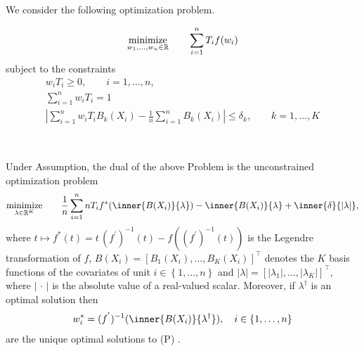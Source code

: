 We consider the following optimization problem.
\begin{problem}
  \begin{gather*}
    \underset{w_1, \ldots, w_n \in \mathbb{R}}{\mathrm{minimize}}
    \qquad
    \sum_{i = 1}^{n} T_i f(w_i)
  \end{gather*}
subject to the constraints
\begin{gather*}
    w_i T_i \ge 0,
    \qquad 
    i = 1, \ldots, n,
    \\
  \sum_{ i = 1 }^{n}
    w_i T_i
  =
  1
  \\
    \left| 
      \sum_{i = 1}^{n} w_i T_i B_k(X_i)
      - 
      \frac{1}{n} \sum_{i = 1}^{n} B_k(X_i)
    \right|
    \le 
    \delta_k,
    \qquad
    k = 1, \ldots, K
\end{gather*}
\end{problem}
\pagebreak
~\begin{ftheorem}
  Under Assumption,
  the dual of the above Problem is the unconstrained optimization problem 
  \begin{gather*}
    \underset{\lambda \in \R^K}{\mathrm{minimize}}
    \qquad
    \frac{1}{n}
    \sum_{i = 1}^{n} 
    nT_i 
    f^*
    (
      \inner{B(X_i)}{\lambda}
    )
    -
    \inner{B(X_i)}{\lambda}
    +
    \inner{\delta}{\left| \lambda \right|}
    ,
  \end{gather*}
  where
  $
  t \mapsto
    f^*(t)
    =
    t\,(f^{'})^{-1}(t)
    -
    f
    \left( 
      (f^{'})^{-1}(t)
    \right)
  $
  is the Legendre transformation of $f$,
  $
    B(X_i)
    =
    \left[ 
      B_1(X_i)
      ,
      \ldots
      ,
      B_K(X_i)
    \right]
    ^\top
  $
  denotes the $K$ basis functions of the covariates 
  of unit $i\in \left\{ 1, \ldots, n \right\}$
  and
  $
    \left| \lambda \right|
    =
    \left[ 
      \left| \lambda_1 \right|
      ,
      \ldots
      ,
      \left| \lambda_K \right|
    \right]
    ^\top
    ,
  $
  where $\left| \,\cdot\, \right|$
  is the absolute value of a real-valued scalar.
  Moreover, if $\lambda^\dagger$
  is an optimal solution then
  \begin{gather}
    w_i^*
    =
    (f^{'})^{-1}
    (
      \inner{B(X_i)}{\lambda^\dagger}
    )
    ,
    \quad
    i\in \left\{ 1,\ldots, n \right\}
  \end{gather}
  are the unique optimal solutions to (P)
  .
\end{ftheorem}
